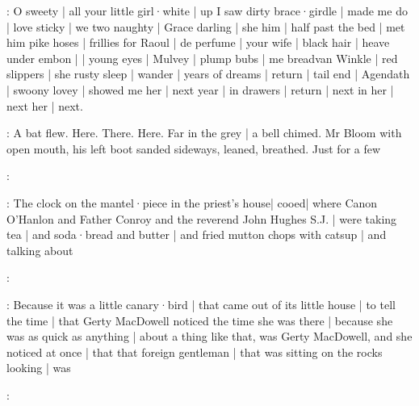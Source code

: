 \BloomToday:
O sweety |
all your little girl·white |
up I saw dirty brace·girdle |
made me do |
love sticky |
we two naughty |
Grace darling |%
she him |
half past the bed |
met him pike hoses |
frillies for Raoul |
de perfume |
your wife |
black hair |
heave under embon |
 |
young eyes |
Mulvey |
plump bubs |
me breadvan Winkle |
red slippers |
she rusty sleep |
wander |
years of dreams |
return |
tail end |
Agendath |
swoony lovey |
showed me her |
next year |
in drawers |
return |
next in her |
next her |
next.

:
A bat flew.
Here.
There.
Here.
Far in the grey |
a bell chimed.
Mr Bloom with open mouth,
his left boot sanded sideways,
leaned,
breathed.
Just for a few

:

\Nrelig:
The clock on the mantel·piece in the priest's house| 
cooed| 
where Canon O'Hanlon
and Father Conroy
and the reverend John Hughes S.J. | 
were taking tea |
and soda·bread and butter |
and fried mutton chops with catsup |
and talking about

:

:
Because it was a little canary·bird |
that came out of its little house |
to tell the time |
that Gerty MacDowell noticed the time she was there |%
because she was as quick as anything |
about a thing like that,
was Gerty MacDowell,
and she noticed at once |
that that foreign gentleman |
that was sitting on the rocks looking |
was

:
